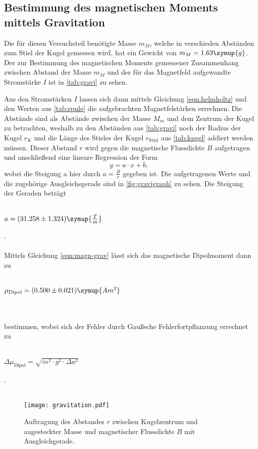 \subsection{Bestimmung des magnetischen Moments mittels Gravitation}
  Die für diesen Versuchsteil benötigte Masse $m_M$, welche in verschieden Abständen zum Stiel der Kugel gemessen wird, hat ein Gewicht von
  $m_M = 1.63 \symup{g}$. 
  Der zur Bestimmung des magnetischen Moments gemessener Zusammenhang zwischen Abstand der Masse $m_M$ und der für das Magnetfeld
  aufgewandte Stromstärke $I$ ist in \autoref{tab:gravi} zu sehen.
  
  Aus den Stromstärken $I$ lassen sich dann mittels Gleichung \eqref{eqn:helmholtz} und den Werten aus \autoref{tab:spule}
   die aufgebrachten Magnetfelstärken errechnen. Die Abstände sind als 
  Abstände zwischen der Masse $M_m$ und dem Zentrum der Kugel zu betrachten, weshalb zu den Abständen aus \autoref{tab:gravi} 
  noch der Radius der Kugel $r_K$ und die Länge des Stieles der Kugel $r_\text{Stiel}$ aus \autoref{tab:kugel} addiert werden müssen.
  Dieser Abstand $r$ wird gegen die magnetische Flussdichte $B$ aufgetragen und anschließend eine lineare Regression der Form 
  \begin{equation}
  \label{eqn:Gerade}
    y = a \cdot x + b,
  \end{equation}
  wobei die Steigung a hier durch $a = \frac{B}{r}$ gegeben ist. Die aufgetragenen Werte und die zugehörige Ausgleichsgerade
  sind in \autoref{fig:gravigraph} zu sehen.
  Die Steigung der Geraden beträgt
  \\ \\
  \centerline{$a = (31.258 \pm 1.324) \symup{\frac{T}{m}}$}.
  \\ \\ 
  Mittels Gleichung \eqref{eqn:magn-grav} lässt sich das magnetische Dipolmoment dann zu
  \\ \\ 
  \centerline{$\mu_\text{Dipol} = (0.500 \pm 0.021) \symup{A m^2}$}
  \\ \\
  bestimmen, wobei sich der Fehler durch Gaußsche Fehlerfortpflanzung errechnet zu 
  \\ \\
  \centerline{$\Delta \mu_\text{Dipol} = \sqrt{m^2 \cdot g^2 \cdot \Delta a^2}$}.
  \\ \\


\begin{figure}
  \centering
  \texttt{[image: gravitation.pdf]}
  \caption{Auftragung des Abstandes $r$ zwischen Kugelzentrum und augesteckter Masse und magnetischer Flussdichte $B$ mit Ausgleichgerade.}
  \label{fig:gravigraph}
\end{figure}

